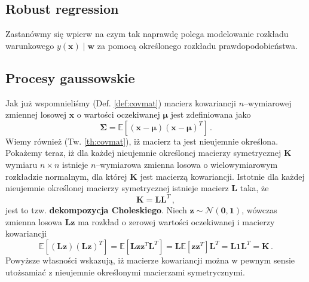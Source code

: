 \documentclass{myclass}
\numberwithin{equation}{section}
\begin{document}
\subsection{Robust regression}

Zastanówmy się wpierw na czym tak naprawdę polega modelowanie rozkładu warunkowego \(y(\mathbf{x})
\mid \mathbf{w}\) za pomocą określonego rozkładu prawdopodobieństwa.


\subsection{Procesy gaussowskie}

Jak już wspomnieliśmy (Def. \ref{def:covmat}) macierz kowariancji \(n\)--wymiarowej zmiennej losowej
\(\mathbf{x}\) o wartości oczekiwanej \(\boldsymbol{\mu}\) jest zdefiniowana jako
\begin{equation}
    \mathbf{\Sigma} = \mathbb{E}\left[(\mathbf{x} - \boldsymbol{\mu})(\mathbf{x} - \boldsymbol{\mu})^T\right]\,.
\end{equation}
Wiemy również (Tw. \ref{th:covmat}), iż macierz ta jest nieujemnie określona. Pokażemy teraz, iż dla
każdej nieujemnie określonej macierzy symetrycznej \(\mathbf{K}\) wymiaru \(n\times n\) istnieje
\(n\)--wymiarowa zmienna losowa o wielowymiarowym rozkładzie normalnym, dla której \(\mathbf{K}\)
jest macierzą kowariancji. Istotnie dla każdej nieujemnie określonej macierzy symetrycznej istnieje
macierz \(\mathbf{L}\) taka, że
\begin{equation}
    \mathbf{K} = \mathbf{L}\mathbf{L}^T\,,
\end{equation}
jest to tzw. \textbf{dekompozycja Choleskiego}. Niech \(\mathbf{z} \sim \mathcal{N}(\mathbf{0},
\mathbf{1})\), wówczas zmienna losowa \(\mathbf{L}\mathbf{z}\) ma rozkład o zerowej wartości
oczekiwanej i macierzy kowariancji
\begin{equation}
    \mathbb{E}\left[(\mathbf{L}\mathbf{z})(\mathbf{L}\mathbf{z})^T\right] = \mathbb{E}\left[\mathbf{L}\mathbf{z}\mathbf{z}^T\mathbf{L}^T\right] = \mathbf{L}\mathbb{E}[\mathbf{z}\mathbf{z}^T]\mathbf{L}^T = \mathbf{L}\mathbf{1}\mathbf{L}^T = \mathbf{K}\,.
\end{equation}
Powyższe własności wskazują, iż macierze kowariancji można w pewnym sensie utożsamiać z nieujemnie
określonymi macierzami symetrycznymi.
\end{document}
